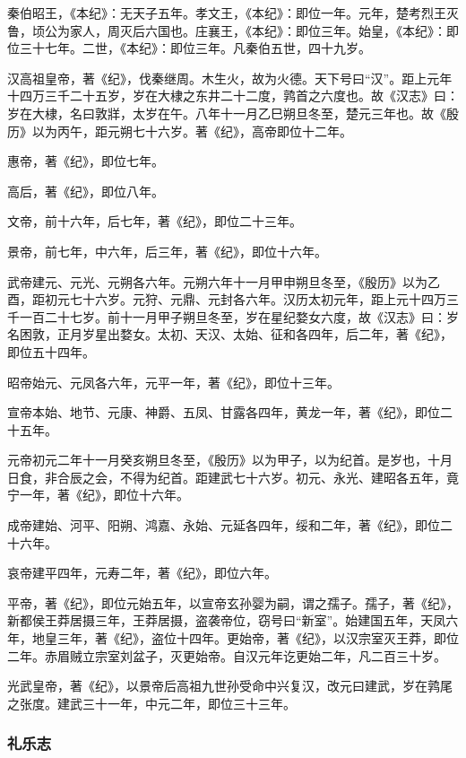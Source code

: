 \documentclass[]{article}
\begin{document}
秦伯昭王，《本纪》：无天子五年。孝文王，《本纪》：即位一年。元年，楚考烈王灭鲁，顷公为家人，周灭后六国也。庄襄王，《本纪》：即位三年。始皇，《本纪》：即位三十七年。二世，《本纪》：即位三年。凡秦伯五世，四十九岁。

汉高祖皇帝，著《纪》，伐秦继周。木生火，故为火德。天下号曰``汉''。距上元年十四万三千二十五岁，岁在大棣之东井二十二度，鹑首之六度也。故《汉志》曰：岁在大棣，名曰敦牂，太岁在午。八年十一月乙巳朔旦冬至，楚元三年也。故《殷历》以为丙午，距元朔七十六岁。著《纪》，高帝即位十二年。

惠帝，著《纪》，即位七年。

高后，著《纪》，即位八年。

文帝，前十六年，后七年，著《纪》，即位二十三年。

景帝，前七年，中六年，后三年，著《纪》，即位十六年。

武帝建元、元光、元朔各六年。元朔六年十一月甲申朔旦冬至，《殷历》以为乙酉，距初元七十六岁。元狩、元鼎、元封各六年。汉历太初元年，距上元十四万三千一百二十七岁。前十一月甲子朔旦冬至，岁在星纪婺女六度，故《汉志》曰：岁名困敦，正月岁星出婺女。太初、天汉、太始、征和各四年，后二年，著《纪》，即位五十四年。

昭帝始元、元凤各六年，元平一年，著《纪》，即位十三年。

宣帝本始、地节、元康、神爵、五凤、甘露各四年，黄龙一年，著《纪》，即位二十五年。

元帝初元二年十一月癸亥朔旦冬至，《殷历》以为甲子，以为纪首。是岁也，十月日食，非合辰之会，不得为纪首。距建武七十六岁。初元、永光、建昭各五年，竟宁一年，著《纪》，即位十六年。

成帝建始、河平、阳朔、鸿嘉、永始、元延各四年，绥和二年，著《纪》，即位二十六年。

哀帝建平四年，元寿二年，著《纪》，即位六年。

平帝，著《纪》，即位元始五年，以宣帝玄孙婴为嗣，谓之孺子。孺子，著《纪》，新都侯王莽居摄三年，王莽居摄，盗袭帝位，窃号曰``新室''。始建国五年，天凤六年，地皇三年，著《纪》，盗位十四年。更始帝，著《纪》，以汉宗室灭王莽，即位二年。赤眉贼立宗室刘盆子，灭更始帝。自汉元年讫更始二年，凡二百三十岁。

光武皇帝，著《纪》，以景帝后高祖九世孙受命中兴复汉，改元曰建武，岁在鹑尾之张度。建武三十一年，中元二年，即位三十三年。

\hypertarget{header-n1472}{%
\subsubsection{礼乐志}\label{header-n1472}}
\end{document}
